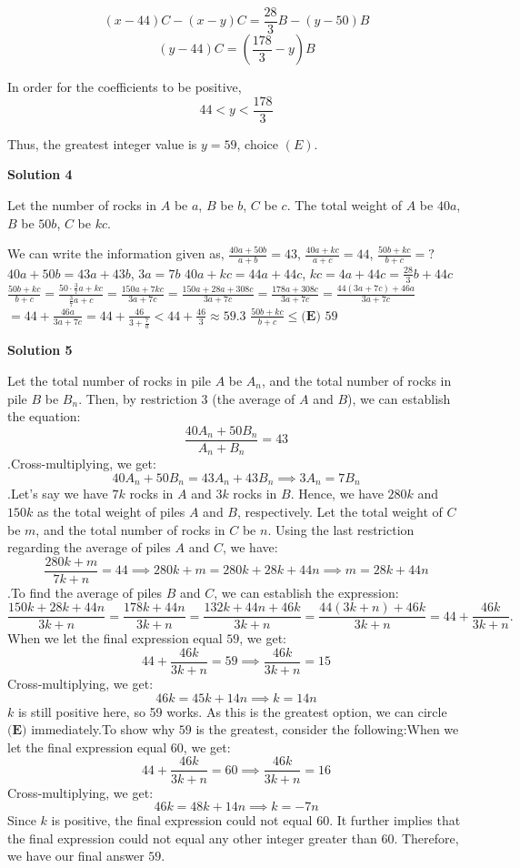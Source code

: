 \begin{enumerate}
 
 \[(x-44)C-(x-y)C=\frac{28}{3}B-(y-50)B\]
 \[(y-44)C=(\frac{178}{3}-y)B\]

 In order for the coefficients to be positive, 
 \[44<y<\frac{178}{3}\]

 Thus, the greatest integer value is $y=59$, choice $(E)$.

 



\textbf{Solution 4}

Let the number of rocks in $A$ be $a$, $B$ be $b$, $C$ be $c$. The total weight of $A$ be $40a$, $B$ be $50b$, $C$ be $kc$.

 We can write the information given as, $\frac{40a + 50b}{a+b} = 43$, $\frac{40a + kc}{a+c} = 44$, $\frac{50b + kc}{b+c} = ?$
$40a + 50b = 43 a + 43 b$, $3a = 7b$
$40a + kc = 44a + 44 c$, $kc = 4a + 44c = \frac{28}{3}b + 44c$
$\frac{50b + kc}{b+c} = \frac{50 \cdot \frac{3}{7}a + kc}{\frac{3}{7}a+c} = \frac{150a + 7kc}{3a + 7c} = \frac{150a + 28a + 308c}{3a+7c} = \frac{178a + 308c}{3a+7c} = \frac{44(3a+7c)+46a}{3a+7c}$
$= 44 + \frac{46a}{3a+7c} = 44 + \frac{46}{3 + \frac{7}{a}} < 44 + \frac{46}{3} \approx 59.3$
$\frac{50b + kc}{b+c} \le \boxed{\textbf{(E) } 59}$




\textbf{Solution 5}

Let the total number of rocks in pile $A$ be $A_n$, and the total number of rocks in pile $B$ be $B_n$. Then, by restriction 3 (the average of $A$ and $B$), we can establish the equation: 
 \[\frac{40A_n+50B_n}{A_n+B_n}=43\].Cross-multiplying, we get: 
 \[40A_n+50B_n=43A_n+43B_n \implies 3A_n=7B_n\].Let's say we have $7k$ rocks in $A$ and $3k$ rocks in $B$. Hence, we have $280k$ and $150k$ as the total weight of piles $A$ and $B$, respectively. Let the total weight of $C$ be $m$, and the total number of rocks in $C$ be $n$. Using the last restriction regarding the average of piles $A$ and $C$, we have: 
 \[\frac{280k+m}{7k+n}=44 \implies 280k + m=280k + 28k + 44n \implies m=28k+44n\].To find the average of piles $B$ and $C$, we can establish the expression: 
 \[\frac{150k+28k+44n}{3k+n}=\frac{178k+44n}{3k+n}=\frac{132k+44n+46k}{3k+n}=\frac{44(3k+n)+46k}{3k+n}=44+\frac{46k}{3k+n}.\]When we let the final expression equal $59$, we get: 
 \[44+\frac{46k}{3k+n}=59\implies\frac{46k}{3k+n}=15\]Cross-multiplying, we get: 
 \[46k=45k+14n\implies k=14n\]$k$ is still positive here, so 59 works. As this is the greatest option, we can circle $\textbf{(E)}$ immediately.To show why $59$ is the greatest, consider the following:When we let the final expression equal $60$, we get: 
 \[44+\frac{46k}{3k+n}=60\implies\frac{46k}{3k+n}=16\]Cross-multiplying, we get: 
 \[46k=48k+14n\implies k=-7n\]Since $k$ is positive, the final expression could not equal 60. It further implies that the final expression could not equal any other integer greater than 60. Therefore, we have our final answer $\boxed{59}$.


\end{enumerate}
